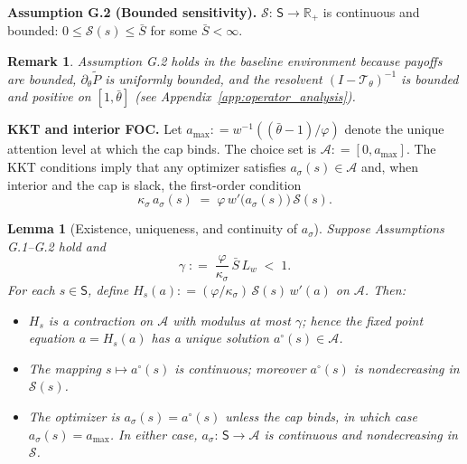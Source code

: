 \documentclass[12pt]{article}
\providecommand{\coloneqq}{\mathrel{\mathop:}=}
\theoremstyle{plain}
\newtheorem{lemma}{Lemma}
\newtheorem{remark}{Remark}
\begin{document}
\noindent\textbf{Assumption G.2 (Bounded sensitivity).} $\mathcal S:\,\mathsf S\to\mathbb R_+$ is continuous and bounded: $0\le \mathcal S(s)\le \bar S$ for some $\bar S<\infty$.

\begin{remark}
	Assumption G.2 holds in the baseline environment because payoffs are bounded, $\partial_\theta \tilde P$ is uniformly bounded, and the resolvent $(I-\mathcal T_\theta)^{-1}$ is bounded and positive on $[1,\bar\theta]$ (see Appendix~\ref{app:operator_analysis}).
\end{remark}

\noindent\textbf{KKT and interior FOC.} Let $a_{\max}\coloneqq w^{-1}((\bar\theta-1)/\varphi)$ denote the unique attention level at which the cap binds. The choice set is $\mathcal A\coloneqq[0,a_{\max}]$. The KKT conditions imply that any optimizer satisfies $a_\sigma(s)\in\mathcal A$ and, when interior and the cap is slack, the first-order condition
\begin{equation}\label{eq:FOC_general}
	\kappa_\sigma\, a_\sigma(s)\;=\;\varphi\, w'\big(a_\sigma(s)\big)\,\mathcal S(s).
\end{equation}

\begin{lemma}[Existence, uniqueness, and continuity of $a_\sigma$]\label{lem:attention_general}
	Suppose Assumptions G.1–G.2 hold and
	\begin{equation}\label{eq:contraction_condition}
		\gamma\;\coloneqq\;\frac{\varphi}{\kappa_\sigma}\,\bar S\,L_w\;<\;1.
	\end{equation}
	For each $s\in\mathsf S$, define $H_s(a)\coloneqq (\varphi/\kappa_\sigma)\,\mathcal S(s)\, w'(a)$ on $\mathcal A$. Then:
	\begin{itemize}
		\item $H_s$ is a contraction on $\mathcal A$ with modulus at most $\gamma$; hence the fixed point equation $a=H_s(a)$ has a unique solution $a^{\circ}(s)\in\mathcal A$.
		\item The mapping $s\mapsto a^{\circ}(s)$ is continuous; moreover $a^{\circ}(s)$ is
		      nondecreasing in $\mathcal S(s)$.
		\item The optimizer is $a_\sigma(s)=a^{\circ}(s)$ unless the cap binds, in which case
		      $a_\sigma(s)=a_{\max}$. In either case, $a_\sigma:\,\mathsf S\to\mathcal A$ is
		      continuous and nondecreasing in $\mathcal S$.
	\end{itemize}
\end{lemma}
\end{document}
